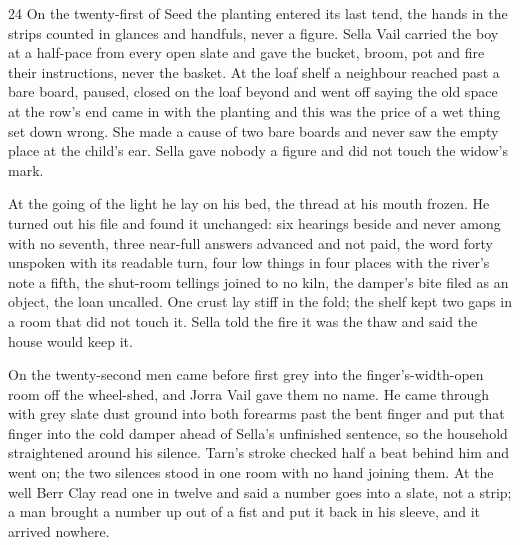 
\scenebreak


\scenebreak


\scenebreak

\CRtailpiece
\begin{CRchronicle}{24}
On the twenty-first of Seed the planting entered its last tend, the hands in the strips counted in glances and handfuls, never a figure. Sella Vail carried the boy at a half-pace from every open slate and gave the bucket, broom, pot and fire their instructions, never the basket. At the loaf shelf a neighbour reached past a bare board, paused, closed on the loaf beyond and went off saying the old space at the row’s end came in with the planting and this was the price of a wet thing set down wrong. She made a cause of two bare boards and never saw the empty place at the child’s ear. Sella gave nobody a figure and did not touch the widow’s mark.

At the going of the light he lay on his bed, the thread at his mouth frozen. He turned out his file and found it unchanged: six hearings beside and never among with no seventh, three near-full answers advanced and not paid, the word forty unspoken with its readable turn, four low things in four places with the river’s note a fifth, the shut-room tellings joined to no kiln, the damper’s bite filed as an object, the loan uncalled. One crust lay stiff in the fold; the shelf kept two gaps in a room that did not touch it. Sella told the fire it was the thaw and said the house would keep it.

On the twenty-second men came before first grey into the finger’s-width-open room off the wheel-shed, and Jorra Vail gave them no name. He came through with grey slate dust ground into both forearms past the bent finger and put that finger into the cold damper ahead of Sella’s unfinished sentence, so the household straightened around his silence. Tarn’s stroke checked half a beat behind him and went on; the two silences stood in one room with no hand joining them. At the well Berr Clay read one in twelve and said a number goes into a slate, not a strip; a man brought a number up out of a fist and put it back in his sleeve, and it arrived nowhere.


\end{CRchronicle}
